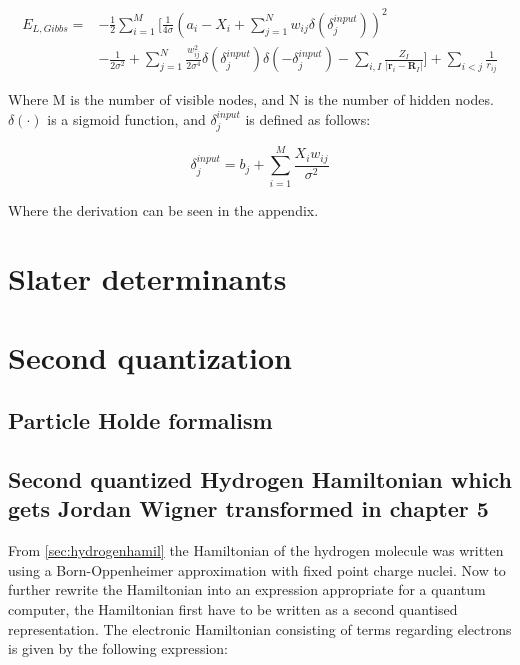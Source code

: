 \documentclass[../main.tex]{subfiles}
\begin{document}
\begin{align*}
	E_{L,Gibbs}=& -\frac{1}{2}\sum_{i=1}^M \biggl[\frac{1}{4\sigma}\left(     a_i-X_i+\sum_{j=1}^N w_{ij}\delta(\delta_j^{input})\right)^2\\
	& -\frac{1}{2\sigma^2}+\sum_{j=1}^N \frac{w_{ij}^2 }{2\sigma^4}\delta(\delta_j^{input})\delta(-\delta_j^{input} ) -\sum_{i, I} \frac{Z_{I}}{\left|\mathbf{r}_{i}-\mathbf{R}_{I}\right|} \biggr] +\sum_{i<j} \frac{1}{r_{ij}}
\end{align*}

Where M is the number of visible nodes, and N is the number of hidden nodes. $\delta(\cdot)$ is a sigmoid function, and $\delta_j^{input}$ is defined as follows:

\begin{equation*}
    \delta_j^{input}=b_j+\sum_{i=1}^M \frac{X_i w_{ij}}{\sigma^2}
    \label{sig:input}
\end{equation*}

Where the derivation can be seen in the appendix.

\section{Slater determinants}
\section{Second quantization}
\subsection{Particle Holde formalism}
\begin{comment}
    \subsection{Reference state}
    Switching order gives - sign, due to fermionic permutation
\end{comment}
\subsection{Second quantized Hydrogen Hamiltonian which gets Jordan Wigner transformed in chapter 5}
From \autoref{sec:hydrogenhamil} the Hamiltonian of the hydrogen molecule was written using a Born-Oppenheimer approximation with fixed point charge nuclei. Now to further rewrite the Hamiltonian into an expression appropriate for a quantum computer, the Hamiltonian first have to be written as a second quantised representation. The electronic Hamiltonian consisting of terms regarding electrons is given by the following expression\cite[S.M.]{McArdle_2019}:
\end{document}
